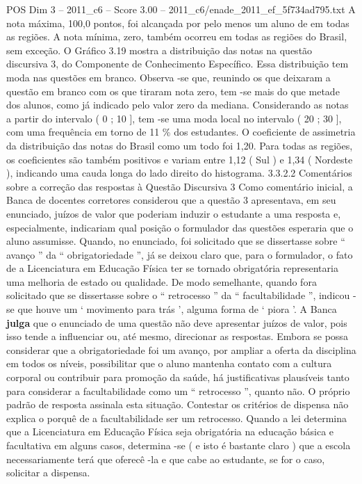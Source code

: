 \begin{textsample}{POS Dim 3 – 2011\_c6 – Score 3.00 – 2011\_c6/enade\_2011\_ef\_5f734ad795.txt}
A nota máxima, 100,0 pontos, foi alcançada por pelo menos um aluno de em todas as regiões.
A nota mínima, zero, também ocorreu em todas as regiões do Brasil, sem exceção.
O Gráfico 3.19 mostra a distribuição das notas na questão discursiva 3, do Componente de Conhecimento Específico.
Essa distribuição tem moda nas questões em branco.
Observa -se que, reunindo os que deixaram a questão em branco com os que tiraram nota zero, tem -se mais do que metade dos alunos, como já indicado pelo valor zero da mediana.
Considerando as notas a partir do intervalo ( 0 ; 10 ], tem -se uma moda local no intervalo ( 20 ; 30 ], com uma frequência em torno de 11 \% dos estudantes.
O coeficiente de assimetria da distribuição das notas do Brasil como um todo foi 1,20.
Para todas as regiões, os coeficientes são também positivos e variam entre 1,12 ( Sul ) e 1,34 ( Nordeste ), indicando uma cauda longa do lado direito do histograma. 3.3.2.2 Comentários sobre a correção das respostas à Questão Discursiva 3 Como comentário inicial, a Banca de docentes corretores considerou que a questão 3 apresentava, em seu enunciado, juízos de valor que poderiam induzir o estudante a uma resposta e, especialmente, indicariam qual posição o formulador das questões esperaria que o aluno assumisse.
Quando, no enunciado, foi solicitado que se dissertasse sobre “ avanço ” da “ obrigatoriedade ”, já se deixou claro que, para o formulador, o fato de a Licenciatura em Educação Física ter se tornado obrigatória representaria uma melhoria de estado ou qualidade.
De modo semelhante, quando fora solicitado que se dissertasse sobre o “ retrocesso ” da “ facultabilidade ”, indicou -se que houve um ‘ movimento para trás ’, alguma forma de ‘ piora ’.
A Banca \textbf{julga} que o enunciado de uma questão não deve apresentar juízos de valor, pois isso tende a influenciar ou, até mesmo, direcionar as respostas.
Embora se possa considerar que a obrigatoriedade foi um avanço, por ampliar a oferta da disciplina em todos os níveis, possibilitar que o aluno mantenha contato com a cultura corporal ou contribuir para promoção da saúde, há justificativas plausíveis tanto para considerar a facultabilidade como um “ retrocesso ”, quanto não.
O próprio padrão de resposta assinala esta situação.
Contestar os critérios de dispensa não explica o porquê de a facultabilidade ser um retrocesso.
Quando a lei determina que a Licenciatura em Educação Física seja obrigatória na educação básica e facultativa em alguns casos, determina -se ( e isto é bastante claro ) que a escola necessariamente terá que oferecê -la e que cabe ao estudante, se for o caso, solicitar a dispensa.

\end{textsample}

